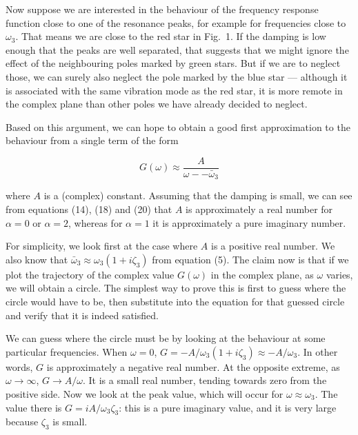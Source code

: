 
  Now suppose we are interested in the behaviour of the frequency response 
  function close to one of the resonance peaks, for example for frequencies 
  close to $\omega_3$. That means we are close to the red star in Fig.\ 1. If 
  the damping is low enough that the peaks are well separated, that suggests 
  that we might ignore the effect of the neighbouring poles marked by green 
  stars. But if we are to neglect those, we can surely also neglect the pole 
  marked by the blue star --- although it is associated with the same vibration 
  mode as the red star, it is more remote in the complex plane than other poles 
  we have already decided to neglect. 

  Based on this argument, we can hope to obtain a good first approximation to 
  the behaviour from a single term of the form 

  $$G(\omega) \approx \dfrac{A}{\omega -- \bar{\omega}_3} \tag{21}$$ 

  where $A$ is a (complex) constant. Assuming that the damping is small, we can 
  see from equations (14), (18) and (20) that $A$ is approximately a real 
  number for $\alpha = 0$ or $\alpha = 2$, whereas for $\alpha=1$ it is 
  approximately a pure imaginary number. 

  For simplicity, we look first at the case where $A$ is a positive real 
  number. We also know that $\bar{\omega}_3 \approx \omega_3(1+i \zeta_3)$ from 
  equation (5). The claim now is that if we plot the trajectory of the complex 
  value $G(\omega)$ in the complex plane, as $\omega$ varies, we will obtain a 
  circle. The simplest way to prove this is first to guess where the circle 
  would have to be, then substitute into the equation for that guessed circle 
  and verify that it is indeed satisfied. 

  We can guess where the circle must be by looking at the behaviour at some 
  particular frequencies. When $\omega=0$, $G=-A/\omega_3(1+i \zeta_3) \approx 
  -A/\omega_3$. In other words, $G$ is approximately a negative real number. At 
  the opposite extreme, as $\omega \rightarrow\infty$, $G \rightarrow 
  A/\omega$. It is a small real number, tending towards zero from the positive 
  side. Now we look at the peak value, which will occur for $\omega \approx 
  \omega_3$. The value there is $G=iA/\omega_3 \zeta_3$: this is a pure 
  imaginary value, and it is very large because $\zeta_3$ is small. 

